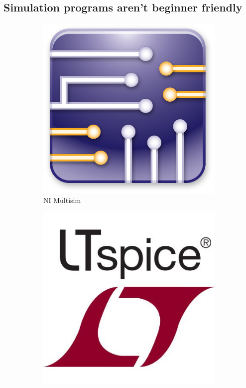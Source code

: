 \documentclass[../main.tex]{subfiles}
\begin{document}
\subsection{Simulation programs aren’t beginner friendly}
\begin{figure}[ht]
     \centering
     \begin{subfigure}{0.25\textwidth}
         \centering
         \includegraphics[width=\textwidth]{images/chapter1/NI Multisim.png}
         \caption{NI Multisim}
         \label{fig:NI Multisim logo}
     \end{subfigure}
     \begin{subfigure}{0.25\textwidth}
         \centering
         \includegraphics[width=\textwidth]{images/chapter1/LTSpice.jpg}

\end{subfigure}
\end{figure}
\end{document}
